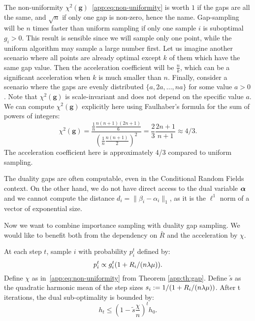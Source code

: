 \begin{subappendices}
	The non-uniformity $\chi^2(\bm g)$~\eqref{app:eq:non-uniformity} is worth $1$ if the gaps
	are all the same, and $\sqrt n$ if only one gap is non-zero, hence the name.
	Gap-sampling will be $n$ times faster than uniform sampling if only one sample $i$ is suboptimal $g_i>0$.
	This result is sensible since we will sample only one point, while the uniform algorithm may sample a large number first.
	Let us imagine another scenario where all points are already optimal except $k$ of them which have the same gap value.
	Then the acceleration coefficient will be $\frac{n}{k}$, which can be a significant acceleration when $k$ is much smaller than $n$.
	Finally, consider a scenario where the gaps are evenly distributed $\{a, 2a, ..., n a\}$ for some value $a > 0$.
	Note that $\chi^2(\bm g)$ is scale-invariant and does not depend on the specific value $a$.
	We can compute $\chi^2(\bm g)$ explicitly here using Faulhaber's formula for the sum of powers of integers:
	\begin{equation*}
		\chi^2(\bm g) = \frac{\frac{1}{n} \frac{n(n+1)(2n+1)}{6}}{\left(\frac{1}{n}\frac{n(n+1)}{2}\right)^2} = \frac{2}{3} \frac{2n+1}{n+1} \approx 4/3.
	\end{equation*}
	The acceleration coefficient here is approximately 4/3 compared to uniform sampling.

	The duality gaps are often computable, even in the Conditional Random Fields context.
	On the other hand, we do not have direct access to the dual variable $\boldsymbol{\alpha}$
	and we cannot compute the distance $d_i = \| \beta_i - \alpha_i \|_1$, as it is the $\ell^1$ norm of a vector of exponential size.

	Now we want to combine importance sampling with duality gap sampling.
	We would like to benefit both from the dependency on $\bar R$ and the acceleration by $\chi$.

	\begin{theorem}
		\label{app:th:gap+}
		At each step $t$, sample $i$ with probability $p_i^t$ defined by:
		\begin{equation}
			p_i^t \propto g_i^t (1+ R_i/(n \lambda \mu)).
		\end{equation}
		Define $\chi$ as in~\eqref{app:eq:non-uniformity} from Theorem \ref{app:th:gap}.
		Define $\tilde s$ as the quadratic harmonic mean of the step sizes $s_i := 1/(1+ R_i/(n \lambda \mu))$.
		After t iterations, the dual sub-optimality is bounded by:
		\begin{equation}
			h_t \leq (1-\tilde s \frac{\chi}{n})^t  h_0.
		\end{equation}
	\end{theorem}


\end{subappendices}
